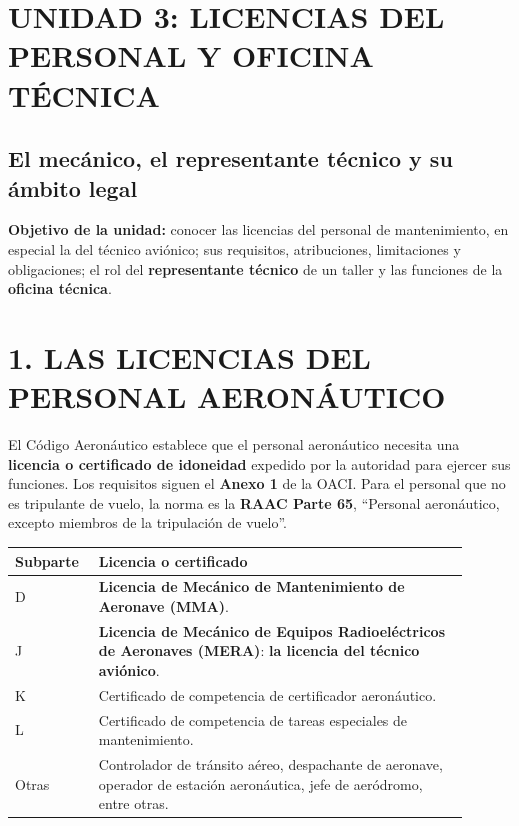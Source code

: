 \clearpage
\section*{UNIDAD 3: LICENCIAS DEL PERSONAL Y OFICINA TÉCNICA}
\subsection*{El mecánico, el representante técnico y su ámbito legal}

\begin{recuadro}
\textbf{Objetivo de la unidad:} conocer las licencias del personal de mantenimiento, en especial
la del técnico aviónico; sus requisitos, atribuciones, limitaciones y obligaciones; el rol del
\textbf{representante técnico} de un taller y las funciones de la \textbf{oficina técnica}.
\end{recuadro}

\section*{1. LAS LICENCIAS DEL PERSONAL AERONÁUTICO}

El Código Aeronáutico establece que el personal aeronáutico necesita una \textbf{licencia o
certificado de idoneidad} expedido por la autoridad para ejercer sus funciones. Los requisitos
siguen el \textbf{Anexo 1} de la OACI. Para el personal que no es tripulante de vuelo, la norma
es la \textbf{RAAC Parte 65}, ``Personal aeronáutico, excepto miembros de la tripulación de
vuelo''.

\begin{center}
\small
\begin{tabular}{|p{0.15\linewidth}|p{0.75\linewidth}|}
\hline
\textbf{Subparte} & \textbf{Licencia o certificado} \\ \hline
D & \textbf{Licencia de Mecánico de Mantenimiento de Aeronave (MMA)}. \\ \hline
J & \textbf{Licencia de Mecánico de Equipos Radioeléctricos de Aeronaves (MERA)}: \textbf{la
licencia del técnico aviónico}. \\ \hline
K & Certificado de competencia de certificador aeronáutico. \\ \hline
L & Certificado de competencia de tareas especiales de mantenimiento. \\ \hline
Otras & Controlador de tránsito aéreo, despachante de aeronave, operador de estación
aeronáutica, jefe de aeródromo, entre otras. \\ \hline
\end{tabular}
\end{center}

